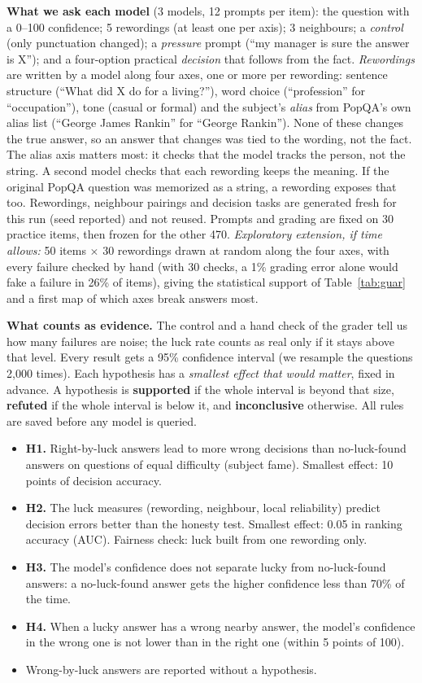 \documentclass[10pt]{article}
\begin{document}
\textbf{What we ask each model} (3 models, 12 prompts per item): the question with a 0--100 confidence; 5 rewordings (at least one per axis); 3 neighbours; a \emph{control} (only punctuation changed); a \emph{pressure} prompt (``my manager is sure the answer is X''); and a four-option practical \emph{decision} that follows from the fact. \emph{Rewordings} are written by a model along four axes, one or more per rewording: sentence structure (``What did X do for a living?''), word choice (``profession'' for ``occupation''), tone (casual or formal) and the subject's \emph{alias} from PopQA's own alias list (``George James Rankin'' for ``George Rankin''). None of these changes the true answer, so an answer that changes was tied to the wording, not the fact. The alias axis matters most: it checks that the model tracks the person, not the string. A second model checks that each rewording keeps the meaning. If the original PopQA question was memorized as a string, a rewording exposes that too. Rewordings, neighbour pairings and decision tasks are generated fresh for this run (seed reported) and not reused. Prompts and grading are fixed on 30 practice items, then frozen for the other 470. \emph{Exploratory extension, if time allows:} 50 items $\times$ 30 rewordings drawn at random along the four axes, with every failure checked by hand (with 30 checks, a 1\% grading error alone would fake a failure in 26\% of items), giving the statistical support of Table~\ref{tab:guar} and a first map of which axes break answers most.

\textbf{What counts as evidence.} The control and a hand check of the grader tell us how many failures are noise; the luck rate counts as real only if it stays above that level. Every result gets a 95\% confidence interval (we resample the questions 2{,}000 times). Each hypothesis has a \emph{smallest effect that would matter}, fixed in advance. A hypothesis is \textbf{supported} if the whole interval is beyond that size, \textbf{refuted} if the whole interval is below it, and \textbf{inconclusive} otherwise. All rules are saved before any model is queried.
\begin{itemize}
\item \textbf{H1.} Right-by-luck answers lead to more wrong decisions than no-luck-found answers on questions of equal difficulty (subject fame). Smallest effect: 10 points of decision accuracy.
\item \textbf{H2.} The luck measures (rewording, neighbour, local reliability) predict decision errors better than the honesty test. Smallest effect: 0.05 in ranking accuracy (AUC). Fairness check: luck built from one rewording only.
\item \textbf{H3.} The model's confidence does not separate lucky from no-luck-found answers: a no-luck-found answer gets the higher confidence less than 70\% of the time.
\item \textbf{H4.} When a lucky answer has a wrong nearby answer, the model's confidence in the wrong one is not lower than in the right one (within 5 points of 100).
\item Wrong-by-luck answers are reported without a hypothesis.
\end{itemize}
\end{document}

